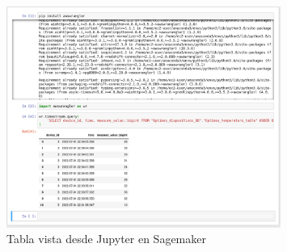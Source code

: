 \documentclass[10pt]{article}
\begin{document}
\begin{figure}[H]
    \centering
    \includegraphics[width=0.8\textwidth]{Images/Jupyter_succesful_query.png}
    \caption{Tabla vista desde Jupyter en Sagemaker}
    \label{fig:sagemaker}
\end{figure}


%
%
\end{document}
